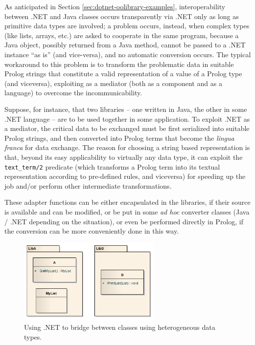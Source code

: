 As anticipated in Section \ref{sec:dotnet-oolibrary-examples}, interoperability between .NET and Java classes occurs transparently via \tuprolog{}.NET only as long as primitive data types are involved; a problem occurs, instead, when complex types (like lists, arrays, etc.) are asked to cooperate in the same \tuprolog{} program, because a Java object, possibly returned from a Java method, cannot be passed to a .NET instance ``as is'' (and vice-versa), and no automatic conversion occurs.
The typical workaround to this problem is to transform the problematic data in suitable Prolog strings that constitute a valid \tuprolog{} representation of a value of a Prolog type (and viceversa), exploiting \tuprolog{} as a mediator (both as a component and as a language) to overcome the incommunicability.

Suppose, for instance, that two libraries -- one written in Java, the other in some .NET language -- are to be used together in some application.
To exploit \tuprolog{}.NET as a mediator, the critical data to be exchanged must be first serialized into suitable Prolog strings, and then converted into Prolog terms that become the \textit{lingua franca} for data exchange.
The reason for choosing a string based representation is that, beyond its easy applicability to virtually any data type, it can exploit the \texttt{text\_term/2} predicate (which transforms a Prolog term into its textual representation according to pre-defined rules, and viceversa) for speeding up the job and/or perform other intermediate transformations.

These adapter functions can be either encapsulated in the libraries, if their source is available and can be modified, or be put in some \textit{ad hoc} converter classes (Java / .NET depending on the situation), or even be performed directly in Prolog, if the conversion can be more conveniently done in this way.

\begin{figure}
   \centering
  \includegraphics[width=7cm]{images/dotnet-pipolo1}
  \caption{Using \tuprolog{}.NET to bridge between classes using heterogeneous data types.}\label{fig:dotnet-pipolo1}
\end{figure}

